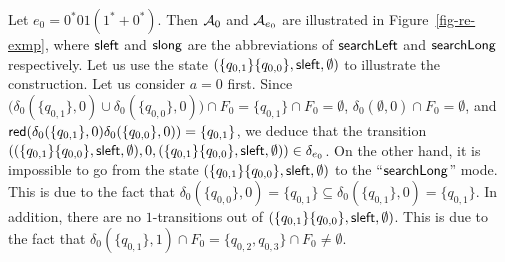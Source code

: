 
\begin{example}\label{exmp-pa-re}
Let $e_0 = 0^*0 1(1^* + 0^*)$. Then $\mathcal{A}_{0}$ and $\mathcal{A}_{e_0}$ are illustrated in Figure~\ref{fig-re-exmp}, where ${\sf sleft}$ and ${\sf slong}$ are the abbreviations of $\mathsf{searchLeft}$ and $\mathsf{searchLong}$ respectively. Let us use the state $(\{q_{0,1}\}\{q_{0,0}\}, {\sf sleft}, \emptyset)$ to illustrate the construction. Let us consider $a = 0$ first. Since $\big(\delta_0(\{q_{0,1}\}, 0) \cup \delta_0(\{q_{0,0}\}, 0)\big) \cap F_0 = \{q_{0,1}\} \cap F_0 = \emptyset$, $\delta_0(\emptyset, 0) \cap F_0 = \emptyset$, and $\mathsf{red}(\delta_0(\{q_{0,1}\}, 0) \delta_0(\{q_{0,0}\}, 0))=\{q_{0,1}\}$, we deduce that the transition $((\{q_{0,1}\}\{q_{0,0}\}, {\sf sleft}, \emptyset), 0, (\{q_{0,1}\} \{q_{0,0}\}, {\sf sleft}, \emptyset)) \in \delta_{e_0}$. On the other hand, it is impossible to go from the state $(\{q_{0,1}\}\{q_{0,0}\}, {\sf sleft}, \emptyset)$ to the ``$\mathsf{searchLong}$'' mode. This is due to the fact that $\delta_0(\{q_{0,0}\}, 0)=\{q_{0,1}\} \subseteq \delta_0(\{q_{0,1}\},0)=\{q_{0,1}\}$. In addition, there are no $1$-transitions out of $(\{q_{0,1}\}\{q_{0,0}\}, {\sf sleft}, \emptyset)$. This is due to the fact that $\delta_0(\{q_{0,1}\}, 1) \cap F_0 = \{q_{0,2}, q_{0,3}\} \cap F_0 \neq \emptyset$.
%
\begin{figure}[htbp]
\begin{center}

\end{center}
\end{figure}
\end{example}
